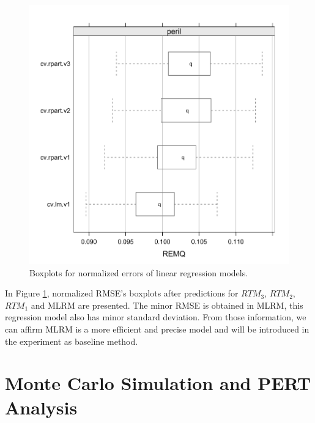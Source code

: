 \begin{figure}[h]
  \vspace{-0.2cm}
  \centering
  \includegraphics[width=\columnwidth]{image/mrl_ex1.pdf}
  \caption{Boxplots for normalized errors of linear regression models.}
  \label{fig:mlrm_result}
\end{figure}

In Figure \ref{fig:mlrm_result}, normalized RMSE's boxplots after predictions for $RTM_3$, $RTM_2$, $RTM_1$ and MLRM are presented. The minor RMSE is obtained in MLRM, this regression model also has minor standard deviation. From those information, we can affirm MLRM is a more efficient and precise model and will be introduced in the experiment as baseline method.

\section{Monte Carlo Simulation and PERT Analysis}

